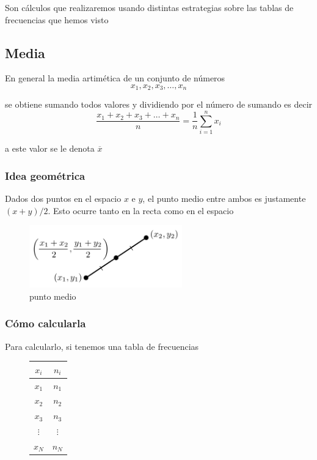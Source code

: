 \documentclass[]{article}
\theoremstyle{plain}
\theoremstyle{definition}
\theoremstyle{definition} %
\begin{document}
Son cálculos que realizaremos usando distintas estrategias sobre las
tablas de frecuencias que hemos visto

\hypertarget{media}{%
\subsection{Media}\label{media}}

En general la media artimética de un conjunto de números
\[x_1, x_2, x_3,\ldots , x_n\]

se obtiene sumando todos valores y dividiendo por el número de sumando
es decir
\[\frac{x_1 + x_2 + x_3 +\ldots  + x_n}{n} = \frac{1}{n}\sum^{n}_{i=1} x_i\]

a este valor se le denota \(\overline x\)

\hypertarget{idea-geomuxe9trica}{%
\subsubsection{Idea geométrica}\label{idea-geomuxe9trica}}

Dados dos puntos en el espacio \(x\) e \(y\), el punto medio entre ambos
es justamente \((x+y)/2\). Esto ocurre tanto en la recta como en el
espacio

\begin{figure}
\centering
\includegraphics[width=2.60417in,height=\textheight]{img/middle_point.png}
\caption{punto medio}
\end{figure}

\hypertarget{cuxf3mo-calcularla}{%
\subsubsection{Cómo calcularla}\label{cuxf3mo-calcularla}}

Para calcularlo, si tenemos una tabla de frecuencias

\begin{figure}
  \centering
\begin{tabular}{cc}
\(x_i\) & \(n_i\)\\
\hline
\(x_1\) & \(n_1\)\\
\(x_2\) & \(n_2\)\\
\(x_3\) & \(n_3\)\\
\(\vdots\) & \(\vdots\)\\
\(x_N\) & \(n_N\)\\
\end{tabular}
\end{figure}
\end{document}
